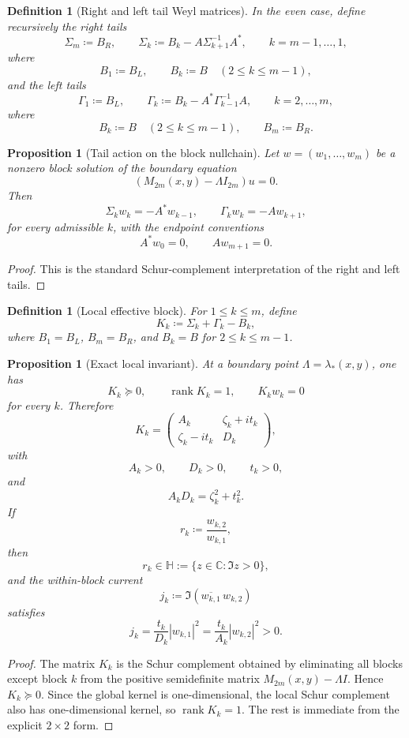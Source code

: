 \documentclass[11pt]{article}
\newtheorem{proposition}[theorem]{Proposition}
\newtheorem{definition}[theorem]{Definition}
\newcommand{\C}{\mathbb C}
\begin{document}
\begin{definition}[Right and left tail Weyl matrices]
In the even case, define recursively the right tails
\[
\Sigma_m\coloneqq B_R,
\qquad
\Sigma_k\coloneqq B_k-A\Sigma_{k+1}^{-1}A^*,
\qquad
k=m-1,\dots,1,
\]
where
\[
B_1\coloneqq B_L,
\qquad
B_k\coloneqq B
\quad (2\le k\le m-1),
\]
and the left tails
\[
\Gamma_1\coloneqq B_L,
\qquad
\Gamma_k\coloneqq B_k-A^*\Gamma_{k-1}^{-1}A,
\qquad
k=2,\dots,m,
\]
where
\[
B_k\coloneqq B
\quad (2\le k\le m-1),
\qquad
B_m\coloneqq B_R.
\]
\end{definition}

\begin{proposition}[Tail action on the block nullchain]\label{prop:tails}
Let \(w=(w_1,\dots,w_m)\) be a nonzero block solution of the boundary equation
\[
(M_{2m}(x,y)-\Lambda I_{2m})u=0.
\]
Then
\[
\Sigma_k w_k=-A^*w_{k-1},
\qquad
\Gamma_k w_k=-Aw_{k+1},
\]
for every admissible \(k\), with the endpoint conventions
\[
A^*w_0=0,
\qquad
Aw_{m+1}=0.
\]
\end{proposition}

\begin{proof}
This is the standard Schur-complement interpretation of the right and left tails.
\end{proof}

\begin{definition}[Local effective block]
For \(1\le k\le m\), define
\[
K_k\coloneqq \Sigma_k+\Gamma_k-B_k,
\]
where \(B_1=B_L\), \(B_m=B_R\), and \(B_k=B\) for \(2\le k\le m-1\).
\end{definition}

\begin{proposition}[Exact local invariant]\label{prop:K}
At a boundary point \(\Lambda=\lambda_*(x,y)\), one has
\[
K_k\succeq 0,
\qquad
\operatorname{rank}K_k=1,
\qquad
K_k w_k=0
\]
for every \(k\). Therefore
\[
K_k=
\begin{pmatrix}
A_k & \zeta_k+i t_k\\
\zeta_k-i t_k & D_k
\end{pmatrix},
\]
with
\[
A_k>0,\qquad D_k>0,\qquad t_k>0,
\]
and
\[
A_kD_k=\zeta_k^2+t_k^2.
\]
If
\[
r_k\coloneqq \frac{w_{k,2}}{w_{k,1}},
\]
then
\[
r_k\in\mathbb H:=\{z\in\C:\Im z>0\},
\]
and the within-block current
\[
j_k\coloneqq \Im(\overline{w_{k,1}}\,w_{k,2})
\]
satisfies
\[
j_k=\frac{t_k}{D_k}|w_{k,1}|^2=\frac{t_k}{A_k}|w_{k,2}|^2>0.
\]
\end{proposition}

\begin{proof}
The matrix \(K_k\) is the Schur complement obtained by eliminating all blocks except block \(k\)
from the positive semidefinite matrix \(M_{2m}(x,y)-\Lambda I\). Hence \(K_k\succeq 0\). Since the
global kernel is one-dimensional, the local Schur complement also has one-dimensional kernel, so
\(\operatorname{rank}K_k=1\). The rest is immediate from the explicit \(2\times2\) form.
\end{proof}
\end{document}
